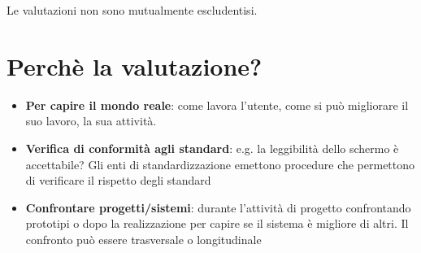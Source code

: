 \documentclass[11pt,a4paper]{book}
\begin{document}
Le valutazioni non sono mutualmente escludentisi.

\section{Perchè la valutazione?}
\begin{itemize}
	\item \textbf{Per capire il mondo reale}: come lavora l'utente, come si può migliorare il suo lavoro, la sua attività.
	\item \textbf{Verifica di conformità agli standard}: e.g. la leggibilità dello schermo è accettabile? Gli enti di standardizzazione emettono procedure che permettono di verificare il rispetto degli standard
	\item \textbf{Confrontare progetti/sistemi}: durante l'attività di progetto confrontando prototipi o dopo la realizzazione per capire se il sistema è migliore di altri. Il confronto può essere trasversale o longitudinale
\end{itemize}
\end{document}
